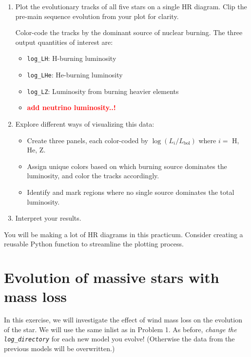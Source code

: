 \documentclass[11pt,a4paper]{article}
\newcommand{\todo}[1]{\textbf{\textcolor{red}{#1}}}
\begin{document}
\begin{enumerate}[label=(\alph*)]
    \item Plot the evolutionary tracks of all five stars on a single HR diagram. 
    Clip the pre-main sequence evolution from your plot for clarity.

    Color-code the tracks by the dominant source of nuclear burning. The three output quantities of interest are:
    \begin{itemize}
        \item \texttt{log\_LH}: H-burning luminosity
        \item \texttt{log\_LHe}: He-burning luminosity
        \item \texttt{log\_LZ}: Luminosity from burning heavier elements
        \item \todo{add neutrino luminosity..!}
    \end{itemize}
    \item Explore different ways of visualizing this data:
    \begin{itemize}[label=--]
        \item Create three panels, each color-coded by $\log (L_i/L_{\text{bol}})$ where $i = $ H, He, Z.
        \item Assign unique colors based on which burning source dominates the luminosity, and color the tracks accordingly.
        \item Identify and mark regions where no single source dominates the total luminosity.
    \end{itemize}

    \item Interpret your results. 

\end{enumerate}



\begin{tcolorbox}[protipbox]
You will be making a lot of HR diagrams in this practicum. Consider creating a reusable Python function to streamline the plotting process.
\end{tcolorbox}


\section{Evolution of massive stars with mass loss}

In this exercise, we will investigate the effect of wind mass loss on the evolution of the star. 
We will use the same inlist as in Problem 1. As before, \emph{change the \texttt{log\_directory}} for each new model you evolve! (Otherwise the data from the previous models will be overwritten.)
\end{document}
